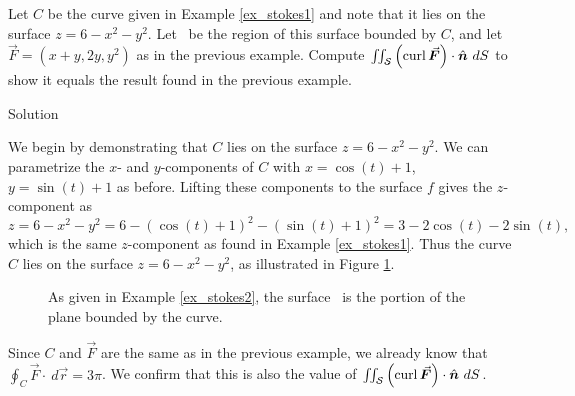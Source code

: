 \begin{example}
\label{ex_stokes2}
Let $C$ be the curve given in Example \ref{ex_stokes1} and note that it lies on the surface $z = 6-x^2-y^2$. Let \surfaceS\ be the region of this surface bounded by $C$, and let $\vec F = \left( x+y,2y,y^2\right)$ as in the previous example. Compute $\iint_\surfaceS \left(\curl\vec F\right)\cdot \hat n\ dS $ to show it equals the result found in the previous example.


Solution 

We begin by demonstrating that $C$ lies on the surface $z=6-x^2-y^2$. We can parametrize the $x$- and $y$-components of $C$ with $x=\cos (t)+1$, $y=\sin (t)+1$ as before. Lifting these components to the surface $f$ gives the $z$-component as 
$$z = 6-x^2-y^2 = 6-\left(\cos (t)+1\right)^2-\left(\sin (t)+1\right)^2 = 3-2\cos (t)-2\sin (t),$$
which is the same $z$-component as found in Example \ref{ex_stokes1}. Thus the curve $C$ lies on the surface $z=6-x^2-y^2$, as illustrated in Figure \ref{fig_Vector_Calc_32}. 


\begin{figure}[H]
\centering
\qquad
{}
\caption{\label{fig_Vector_Calc_32}As given in Example \ref{ex_stokes2}, the surface \surfaceS\ is the portion of the plane bounded by the curve.}
\end{figure}



Since $C$ and $\vec F$ are the same as in the previous example, we already know that $\oint_C\vec F\cdot\ d\vec r = 3\pi$. We confirm that this is also the value of $\iint_\surfaceS \left(\curl\vec F\right)\cdot \hat n\ dS $.


\end{example}
